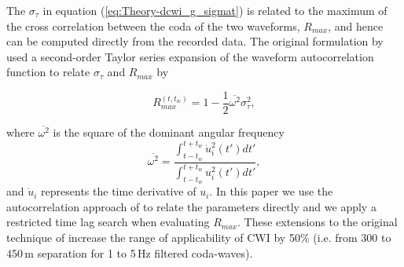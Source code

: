 \documentclass[12pt,double]{article}
\begin{document}
The $\sigma_\tau$ in equation (\ref{eq:Theory-dcwi_g_sigmat}) is
related to the maximum of the cross correlation between the coda of
the two waveforms, $R_{max}$, and hence can be computed directly
from the recorded data. The original formulation by
\citet{dr_Snieder05a} used a second-order Taylor series expansion of
the waveform autocorrelation function to relate $\sigma_\tau$ and
$R_{max}$ by
\begin{linenomath*} \begin{equation}
\label{eq:Rmax-disp-orig} R_{max}^{(t,t_w)} = 1 - \frac{1}{2}
\overline{\omega^2} \sigma_\tau^2,
\end{equation} \end{linenomath*}
where $\overline{\omega^2}$ is the square of the dominant angular frequency
\begin{equation}
\label{eq:square-of-domangfreq}
\overline{\omega^2} =
\frac{\int_{t-t_w}^{t+t_w}\dot{u}_i^2(t')dt'}{\int_{t-t_w}^{t+t_w}u_i^2(t')dt'},
\end{equation}
and $\dot{u}_i$ represents the time derivative of $u_i$.
In this paper we use the autocorrelation approach of
\citet{dr_Robinson11a} to relate the parameters directly and we
apply a restricted time lag search when evaluating $R_{max}$. These
extensions to the original technique of \citet{dr_Snieder05a}
increase the range of applicability of CWI by 50\% (i.e. from 300 to
450\,m separation for 1 to 5\,Hz filtered coda-waves).
\end{document}
